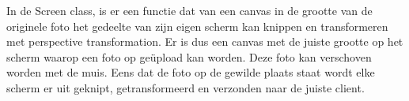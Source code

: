 In de Screen class, is er een functie dat van een canvas in de grootte van de originele foto het gedeelte van zijn eigen scherm kan knippen en transformeren met perspective transformation.
Er is dus een canvas met de juiste grootte op het scherm waarop een foto op geüpload kan worden. Deze foto kan verschoven worden met de muis. Eens dat de foto op de gewilde plaats staat wordt elke scherm er uit geknipt, getransformeerd en verzonden naar de juiste client.